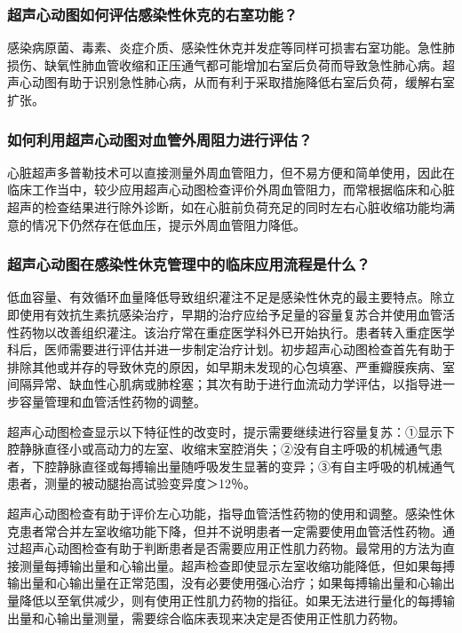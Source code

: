 \subsubsection{超声心动图如何评估感染性休克的右室功能？}

感染病原菌、毒素、炎症介质、感染性休克并发症等同样可损害右室功能。急性肺损伤、缺氧性肺血管收缩和正压通气都可能增加右室后负荷而导致急性肺心病。超声心动图有助于识别急性肺心病，从而有利于采取措施降低右室后负荷，缓解右室扩张。

\subsubsection{如何利用超声心动图对血管外周阻力进行评估？}

心脏超声多普勒技术可以直接测量外周血管阻力，但不易方便和简单使用，因此在临床工作当中，较少应用超声心动图检查评价外周血管阻力，而常根据临床和心脏超声的检查结果进行除外诊断，如在心脏前负荷充足的同时左右心脏收缩功能均满意的情况下仍然存在低血压，提示外周血管阻力降低。

\subsubsection{超声心动图在感染性休克管理中的临床应用流程是什么？}

低血容量、有效循环血量降低导致组织灌注不足是感染性休克的最主要特点。除立即使用有效抗生素抗感染治疗，早期的治疗应给予足量的容量复苏合并使用血管活性药物以改善组织灌注。该治疗常在重症医学科外已开始执行。患者转入重症医学科后，医师需要进行评估并进一步制定治疗计划。初步超声心动图检查首先有助于排除其他或并存的导致休克的原因，如早期未发现的心包填塞、严重瓣膜疾病、室间隔异常、缺血性心肌病或肺栓塞；其次有助于进行血流动力学评估，以指导进一步容量管理和血管活性药物的调整。

超声心动图检查显示以下特征性的改变时，提示需要继续进行容量复苏：①显示下腔静脉直径小或高动力的左室、收缩末室腔消失；②没有自主呼吸的机械通气患者，下腔静脉直径或每搏输出量随呼吸发生显著的变异；③有自主呼吸的机械通气患者，测量的被动腿抬高试验变异度＞12％。

超声心动图检查有助于评价左心功能，指导血管活性药物的使用和调整。感染性休克患者常合并左室收缩功能下降，但并不说明患者一定需要使用血管活性药物。通过超声心动图检查有助于判断患者是否需要应用正性肌力药物。最常用的方法为直接测量每搏输出量和心输出量。超声检查即使显示左室收缩功能降低，但如果每搏输出量和心输出量在正常范围，没有必要使用强心治疗；如果每搏输出量和心输出量降低以至氧供减少，则有使用正性肌力药物的指征。如果无法进行量化的每搏输出量和心输出量测量，需要综合临床表现来决定是否使用正性肌力药物。

